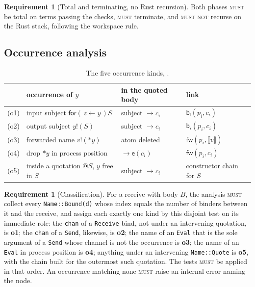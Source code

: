 \documentclass[11pt,a4paper]{article}
\makeatletter
\newcommand{\code}[1]{\texttt{#1}}
\newcommand{\MUST}{\textsc{must}}
\newcommand{\MUSTNOT}{\textsc{must not}}
\newcommand{\quo}[1]{@#1}
\newcommand{\drp}[1]{{*}#1}
\newcommand{\inp}[3]{\mathsf{for}(\,#1 \leftarrow #2\,)#3}
\newcommand{\out}[2]{#1!(#2)}
\newcommand{\enc}[1]{\llbracket #1 \rrbracket}
\newcommand{\fw}{\mathsf{fw}}
\newcommand{\bl}{\mathsf{b}_{\mathsf{l}}}
\newcommand{\br}{\mathsf{b}_{\mathsf{r}}}
\newcommand{\ev}{\mathsf{e}}
\theoremstyle{definition}
\newtheorem{requirement}[definition]{Requirement}
\theoremstyle{plain}
\makeatother
\begin{document}
\begin{requirement}[Total and terminating, no Rust recursion]\label{req:total}
Both phases \MUST{} be total on terms passing the checks, \MUST{} terminate,
and \MUSTNOT{} recurse on the Rust stack, following the workspace rule.
\end{requirement}

\subsection{Occurrence analysis}\label{sec:occ}

\begin{table}[t]
\centering
\begin{tabularx}{\linewidth}{@{}llX l@{}}
\toprule
 & occurrence of $y$ & in the quoted body & link\\
\midrule
(o1) & input subject $\inp{z}{y}{S}$ & subject $\to c_{i}$ & $\bl(p_{i},c_{i})$\\
(o2) & output subject $\out{y}{S}$ & subject $\to c_{i}$ & $\br(p_{i},c_{i})$\\
(o3) & forwarded name $\out{v}{\drp{y}}$ & atom deleted & $\fw(p_{i},\enc{v})$\\
(o4) & drop $\drp{y}$ in process position & $\to \ev(c_{i})$ & $\fw(p_{i},c_{i})$\\
(o5) & inside a quotation $\quo{S}$, $y$ free in $S$ & subject $\to c_{i}$
     & constructor chain for $S$\\
\bottomrule
\end{tabularx}
\caption{The five occurrence kinds, \cite[Table~1]{draft3}.}
\label{tab:links}
\end{table}

\begin{requirement}[Classification]\label{req:classify}
For a receive with body $B$, the analysis \MUST{} collect every
\code{Name::Bound(d)} whose index equals the number of binders between it and
the receive, and assign each exactly one kind by this disjoint test on its
immediate role: the \code{chan} of a \code{Receive} bind, not under an
intervening quotation, is \textbf{o1}; the \code{chan} of a \code{Send},
likewise, is \textbf{o2}; the name of an \code{Eval} that is the sole argument
of a \code{Send} whose channel is not the occurrence is \textbf{o3}; the name
of an \code{Eval} in process position is \textbf{o4}; anything under an
intervening \code{Name::Quote} is \textbf{o5}, with the chain built for the
outermost such quotation. The tests \MUST{} be applied in that order. An
occurrence matching none \MUST{} raise an internal error naming the node.
\end{requirement}
\end{document}
